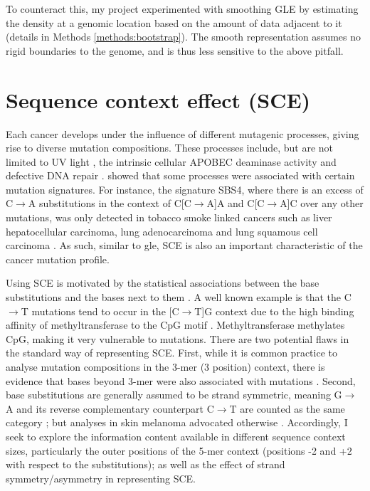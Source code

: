 To counteract this, my project experimented with smoothing GLE by estimating the \gls{density} at a genomic location based on the amount of data adjacent to it (details in Methods \ref{methods:bootstrap}). The smooth representation assumes no rigid boundaries to the genome, and is thus less sensitive to the above pitfall. 



\section{Sequence context effect (SCE)}
\label{intro:sce}

Each cancer develops under the influence of different mutagenic processes, giving rise to diverse mutation compositions. These processes include, but are not limited to UV light \citep[known to drive skin melanoma;][]{Mohania2017}, the intrinsic cellular APOBEC deaminase activity \citep[\textit{e.g.} in B cells;][]{Kuppers2005MechanismsPathogenesis} and defective DNA repair \citep[\textit{e.g.} mutated \textit{BRCA} genes in breast cancer;][]{Navasardyan2021YY1TNBC}. \citet{Alexandrov2013, Alexandrov2020} showed that some processes were associated with certain mutation signatures. For instance, the signature SBS4, where there is an excess of C$\rightarrow$A substitutions in the context of C[C$\rightarrow$A]A and C[C$\rightarrow$A]C over any other mutations, was only detected in tobacco smoke linked cancers such as liver hepatocellular carcinoma, lung adenocarcinoma and lung squamous cell carcinoma \citep{Alexandrov2020}. As such, similar to \gls{gle}, SCE is also an important characteristic of the cancer mutation profile. 

Using SCE is motivated by the statistical associations between the base substitutions and the \glspl{base} next to them \citep{Zhu2017}. A well known example is that the C$\rightarrow$T mutations tend to occur in the [C$\rightarrow$T]G context due to the high binding affinity of methyltransferase to the CpG motif \citep[Figure \ref{fig:motif_demo};][]{Cooper2010}. Methyltransferase methylates CpG, making it very vulnerable to mutations. There are two potential flaws in the standard way of representing SCE. First, while it is common practice to analyse mutation compositions in the 3-mer (3 position) context, there is evidence that bases beyond 3-mer were also associated with mutations \citep{Zhu2017,Zhu2020}. Second, base substitutions are generally assumed to be strand symmetric, meaning G$\rightarrow$A and its reverse complementary counterpart C$\rightarrow$T are counted as the same category \citep[Figure \ref{fig:motif_symmetric_demo};][]{Alexandrov2013, Jiao2020}; but analyses in skin melanoma advocated otherwise \citep{Zhu2017}. Accordingly, I seek to explore the information content available in different sequence context sizes, particularly the outer positions of the 5-mer context (positions -2 and +2 with respect to the substitutions); as well as the effect of strand symmetry/asymmetry in representing SCE.


